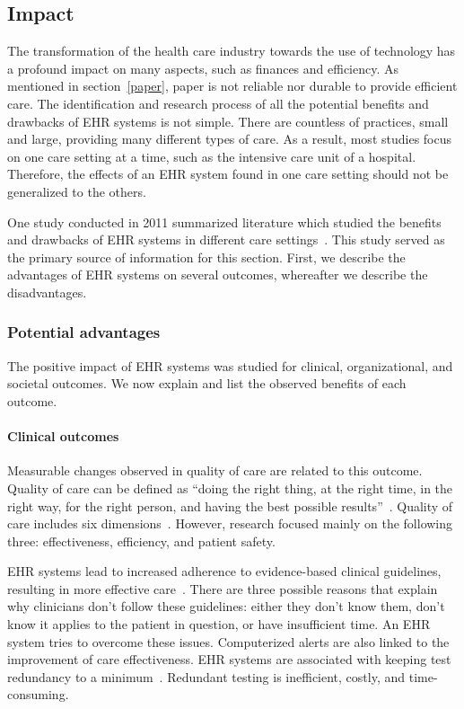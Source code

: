     \subsection{Impact}\label{impact_ehrs}

    The transformation of the health care industry towards the use of technology has a profound impact on many aspects, such as finances and efficiency. As mentioned in section~\ref{paper}, paper is not reliable nor durable to provide efficient care. The identification and research process of all the potential benefits and drawbacks of EHR systems is not simple. There are countless of practices, small and large, providing many different types of care. As a result, most studies focus on one care setting at a time, such as the intensive care unit of a hospital. Therefore, the effects of an EHR system found in one care setting should not be generalized to the others.

    One study conducted in 2011 summarized literature which studied the benefits and drawbacks of EHR systems in different care settings~\cite{Menachemi2011}. This study served as the primary source of information for this section. First, we describe the advantages of EHR systems on several outcomes, whereafter we describe the disadvantages.

        \subsubsection{Potential advantages}\label{ehrs_advantages}

        The positive impact of EHR systems was studied for clinical, organizational, and societal outcomes. We now explain and list the observed benefits of each outcome.

        \paragraph{Clinical outcomes} Measurable changes observed in quality of care are related to this outcome. Quality of care can be defined as ``doing the right thing, at the right time, in the right way, for the right person, and having the best possible results''~\cite{AHRQ2001}. Quality of care includes six dimensions~\cite{CTQC2001}. However, research focused mainly on the following three: effectiveness, efficiency, and patient safety.

        EHR systems lead to increased adherence to evidence-based clinical guidelines, resulting in more effective care~\cite{Menachemi2011}. There are three possible reasons that explain why clinicians don't follow these guidelines: either they don't know them, don't know it applies to the patient in question, or have insufficient time. An EHR system tries to overcome these issues. Computerized alerts are also linked to the improvement of care effectiveness. EHR systems are associated with keeping test redundancy to a minimum~\cite{Menachemi2011}. Redundant testing is inefficient, costly, and time-consuming. 

